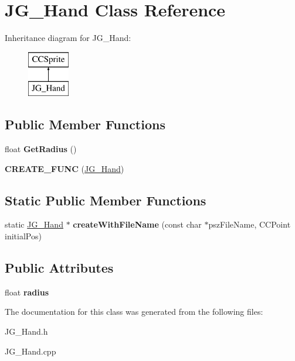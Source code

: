 \hypertarget{class_j_g___hand}{\section{J\-G\-\_\-\-Hand Class Reference}
\label{class_j_g___hand}
}
Inheritance diagram for J\-G\-\_\-\-Hand\-:\begin{figure}[H]
\begin{center}
\leavevmode
\includegraphics[height=2.000000cm]{class_j_g___hand}
\end{center}
\end{figure}
\subsection*{Public Member Functions}
\begin{DoxyCompactItemize}
\item 
\hypertarget{class_j_g___hand_aa66f82060cc53cf1790d2611476c76c0}{float {\bfseries Get\-Radius} ()}\label{class_j_g___hand_aa66f82060cc53cf1790d2611476c76c0}

\item 
\hypertarget{class_j_g___hand_aca220b8f6b4920e9324dd6b3e4f038ab}{{\bfseries C\-R\-E\-A\-T\-E\-\_\-\-F\-U\-N\-C} (\hyperlink{class_j_g___hand}{J\-G\-\_\-\-Hand})}\label{class_j_g___hand_aca220b8f6b4920e9324dd6b3e4f038ab}

\end{DoxyCompactItemize}
\subsection*{Static Public Member Functions}
\begin{DoxyCompactItemize}
\item 
\hypertarget{class_j_g___hand_af1e8c1afe129641193dc4f459ea3da62}{static \hyperlink{class_j_g___hand}{J\-G\-\_\-\-Hand} $\ast$ {\bfseries create\-With\-File\-Name} (const char $\ast$psz\-File\-Name, C\-C\-Point initial\-Pos)}\label{class_j_g___hand_af1e8c1afe129641193dc4f459ea3da62}

\end{DoxyCompactItemize}
\subsection*{Public Attributes}
\begin{DoxyCompactItemize}
\item 
\hypertarget{class_j_g___hand_abbebb5b5f2b897af0fa566477c817c96}{float {\bfseries radius}}\label{class_j_g___hand_abbebb5b5f2b897af0fa566477c817c96}

\end{DoxyCompactItemize}


The documentation for this class was generated from the following files\-:\begin{DoxyCompactItemize}
\item 
J\-G\-\_\-\-Hand.\-h\item 
J\-G\-\_\-\-Hand.\-cpp\end{DoxyCompactItemize}
